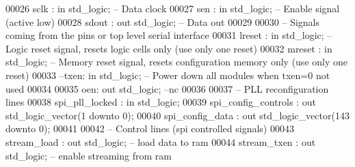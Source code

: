 \begin{DoxyCode}
00026         \textcolor{vhdlchar}{sclk}    \textcolor{vhdlchar}{:} \textcolor{keywordflow}{in} \textcolor{comment}{std\_logic};\textcolor{keyword}{     -- Data clock}
00027         \textcolor{vhdlchar}{sen} \textcolor{vhdlchar}{:} \textcolor{keywordflow}{in} \textcolor{comment}{std\_logic};\textcolor{keyword}{ -- Enable signal (active low)}
00028         \textcolor{vhdlchar}{sdout}   \textcolor{vhdlchar}{:} \textcolor{keywordflow}{out} \textcolor{comment}{std\_logic};\textcolor{keyword}{    -- Data out}
00029     
00030 \textcolor{keyword}{        -- Signals coming from the pins or top level serial interface}
00031         \textcolor{vhdlchar}{lreset}  \textcolor{vhdlchar}{:} \textcolor{keywordflow}{in} \textcolor{comment}{std\_logic};\textcolor{keyword}{     -- Logic reset signal, resets logic cells only  (use only one reset)}
00032         \textcolor{vhdlchar}{mreset}  \textcolor{vhdlchar}{:} \textcolor{keywordflow}{in} \textcolor{comment}{std\_logic};\textcolor{keyword}{     -- Memory reset signal, resets configuration memory only (use only one
       reset)}
00033 \textcolor{keyword}{        --txen: in std\_logic;   -- Power down all modules when txen=0 not used}
00034         
00035         \textcolor{vhdlchar}{oen}\textcolor{vhdlchar}{:} \textcolor{keywordflow}{out} \textcolor{comment}{std\_logic};\textcolor{keyword}{ --nc}
00036         
00037 \textcolor{keyword}{        -- PLL reconfiguration lines}
00038         \textcolor{vhdlchar}{spi_pll_locked}          \textcolor{vhdlchar}{:} \textcolor{keywordflow}{in} \textcolor{comment}{std\_logic};
00039         \textcolor{vhdlchar}{spi_config_controls} \textcolor{vhdlchar}{:} \textcolor{keywordflow}{out} \textcolor{comment}{std\_logic\_vector}\textcolor{vhdlchar}{(}\textcolor{vhdllogic}{}\textcolor{vhdllogic}{1} \textcolor{keywordflow}{downto} \textcolor{vhdllogic}{}\textcolor{vhdllogic}{0}\textcolor{vhdlchar}{)};
00040         \textcolor{vhdlchar}{spi_config_data}         \textcolor{vhdlchar}{:} \textcolor{keywordflow}{out} \textcolor{comment}{std\_logic\_vector}\textcolor{vhdlchar}{(}\textcolor{vhdllogic}{}\textcolor{vhdllogic}{143} \textcolor{keywordflow}{downto} \textcolor{vhdllogic}{}\textcolor{vhdllogic}{0}\textcolor{vhdlchar}{)};
00041         
00042 \textcolor{keyword}{        -- Control lines        (spi controlled signals)}
00043         \textcolor{vhdlchar}{stream_load}     \textcolor{vhdlchar}{:} \textcolor{keywordflow}{out} \textcolor{comment}{std\_logic};\textcolor{keyword}{  --    load data to ram}
00044         \textcolor{vhdlchar}{stream_txen}     \textcolor{vhdlchar}{:} \textcolor{keywordflow}{out} \textcolor{comment}{std\_logic};\textcolor{keyword}{    -- enable streaming from ram}

\end{DoxyCode}
